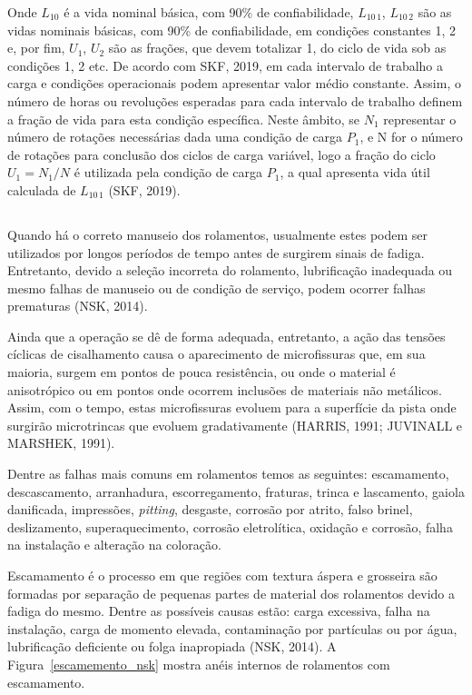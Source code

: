 \documentclass[
	12pt,				
	oneside,			
	a4paper,			
	english,			
	brazil,			
	]{abntex2ppgsi}
\begin{document}
Onde $L_{10}$ é a vida nominal básica, com 90\% de confiabilidade, $L_{10 \,1}$, $L_{10 \,2}$ são as vidas nominais básicas, com 90\% de confiabilidade, em condições constantes 1, 2 e, por fim, $U_{1}$, $U_{2}$ são as frações, que devem totalizar 1, do ciclo de vida sob as condições 1, 2 etc. De acordo com SKF, 2019, em cada intervalo de trabalho a carga e condições operacionais podem apresentar valor médio constante. Assim, o número de horas ou revoluções esperadas para cada intervalo de trabalho definem a fração de vida para esta condição específica. Neste âmbito, se ${N_{1}}$ representar o número de rotações necessárias dada uma condição de carga ${P_{1}}$, e N for o número de rotações para conclusão dos ciclos de carga variável, logo a fração do ciclo ${U_{1} = N_{1} / N}$ é utilizada pela condição de carga ${P_{1}}$, a qual apresenta vida útil calculada de ${L_{10 \,1}}$ (SKF, 2019).

\subsection{}

Quando há o correto manuseio dos rolamentos, usualmente estes podem ser utilizados por longos períodos de tempo antes de surgirem sinais de fadiga. Entretanto, devido a seleção incorreta do rolamento, lubrificação inadequada ou mesmo falhas de manuseio ou de condição de serviço, podem ocorrer falhas prematuras (NSK, 2014).

Ainda que a operação se dê de forma adequada, entretanto, a ação das tensões cíclicas de cisalhamento causa o aparecimento de microfissuras que, em sua maioria, surgem em pontos de pouca resistência, ou onde o material é anisotrópico  ou em pontos onde ocorrem inclusões de materiais não metálicos. Assim, com o tempo, estas microfissuras evoluem para a superfície da pista onde surgirão microtrincas que evoluem gradativamente (HARRIS, 1991; JUVINALL e MARSHEK, 1991).

Dentre as falhas mais comuns em rolamentos temos as seguintes: escamamento, descascamento, arranhadura, escorregamento, fraturas, trinca e lascamento, gaiola danificada, impressões, \textit{pitting}, desgaste, corrosão por atrito, falso brinel, deslizamento, superaquecimento, corrosão eletrolítica, oxidação e corrosão, falha na instalação e alteração na coloração.

Escamamento é o processo em que regiões com textura áspera e grosseira são formadas por separação de pequenas partes de material dos rolamentos devido a fadiga do mesmo. Dentre as possíveis causas estão: carga excessiva, falha na instalação, carga de momento elevada, contaminação por partículas ou por água, lubrificação deficiente ou folga inapropiada (NSK, 2014). A Figura~\ref{escamemento_nsk} mostra anéis internos de rolamentos com escamamento. 
\end{document}
